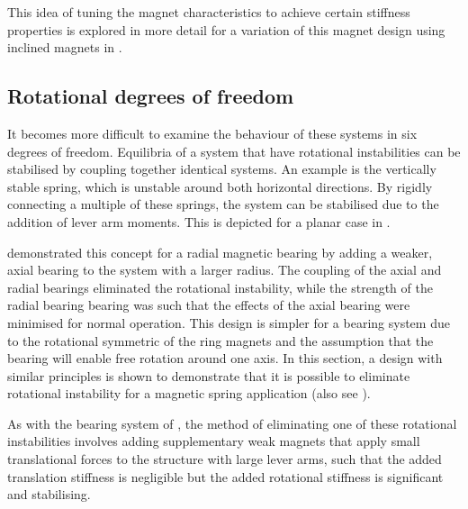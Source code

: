 \documentclass[11pt,a4paper]{memoir}
\begin{document}
This idea of tuning the magnet characteristics to achieve certain stiffness properties is explored in more detail for a variation of this magnet design using inclined magnets in .





\subsection{Rotational degrees of freedom}

It becomes more difficult to examine the behaviour of these systems in six degrees of freedom.
Equilibria of a system that have rotational instabilities can be stabilised by coupling together identical systems.
An example is the vertically stable spring, which is unstable around both horizontal directions.
By rigidly connecting a multiple of these springs, the system can be stabilised due to the addition of lever arm moments.
This is depicted for a planar case in .

\begin{figure}
\end{figure}

\textcite{delamare1994-ietm} demonstrated this concept for a radial magnetic bearing by adding a weaker, axial bearing to the system with a larger radius.
The coupling of the axial and radial bearings eliminated the rotational instability, while the strength of the radial bearing bearing was such that the effects of the axial bearing were minimised for normal operation.
This design is simpler for a bearing system due to the rotational symmetric of the ring magnets and the assumption that the bearing will enable free rotation around one axis.
In this section, a design with similar principles is shown to demonstrate that it is possible to eliminate rotational instability for a magnetic spring application (also see ).

As with the bearing system of \textcite{delamare1994-ietm}, the method of eliminating one of these rotational instabilities involves adding supplementary weak magnets that apply small translational forces to the structure with large lever arms, such that the added translation stiffness is negligible but the added rotational stiffness is significant and stabilising.
\end{document}
